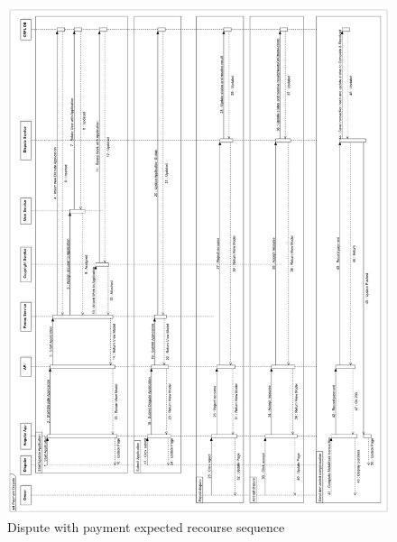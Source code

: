 \begin{figure}[H]
\caption{Dispute with payment expected recourse sequence}
\centering
\includegraphics[width=\textwidth,height=\textheight,keepaspectratio]{images/operational/PaymentDispute}
\end{figure}

